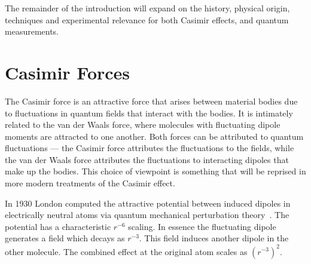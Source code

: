 The remainder of the introduction will expand on the history, physical origin, techniques and experimental 
relevance for both Casimir effects, and quantum measurements.  



\section{Casimir Forces}%

The Casimir force is an attractive force that arises between material bodies due to fluctuations in quantum fields
that interact with the bodies.  It is intimately related to the van der Waals force, where 
molecules with fluctuating dipole moments are attracted to one another.  Both forces can be attributed 
to quantum fluctuations --- the Casimir force attributes the fluctuations to the fields, while
the van der Waals force attributes the fluctuations to interacting dipoles that make up the bodies.  
This choice of viewpoint is something that will be reprised in more modern treatments of the Casimir effect.  

In 1930 London computed the attractive potential between induced dipoles in electrically neutral
atoms via quantum mechanical perturbation theory~\cite{London1930}.  The potential has a characteristic $r^{-6}$ scaling.
In essence the fluctuating dipole generates a field which decays as $r^{-3}$.  This field induces another
dipole in the other molecule.  The combined effect at the original atom scales as $(r^{-3})^2$.  

